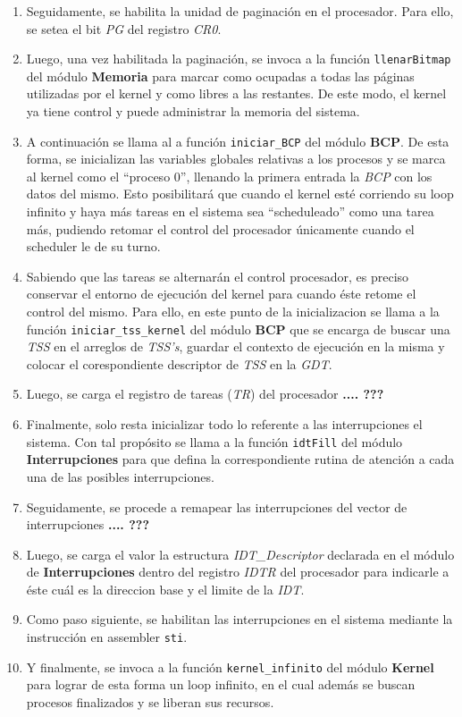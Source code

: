\documentclass[11pt, a4paper]{article}
\begin{document}
\begin{enumerate}
		\item Seguidamente, se habilita la unidad de paginación en el procesador. Para ello, se setea el bit \textit{PG} del registro \textit{CR0}.
		\item Luego, una vez habilitada la paginación, se invoca a la función \texttt{llenarBitmap} del módulo \textbf{Memoria} para marcar como ocupadas a todas las páginas utilizadas por el kernel y como libres a las restantes. De este modo, el kernel ya tiene control y puede administrar la memoria del sistema.
		\item A continuación se llama al a función \texttt{iniciar\_BCP} del módulo \textbf{BCP}. De esta forma, se inicializan las variables globales relativas a los procesos y se marca al kernel como el ``proceso 0'', llenando la primera entrada la \textit{BCP} con los datos del mismo. Esto posibilitará que cuando el kernel esté corriendo su loop infinito y haya más tareas en el sistema sea ``scheduleado'' como una tarea más, pudiendo retomar el control del procesador únicamente cuando el scheduler le de su turno.
		\item Sabiendo que las tareas se alternarán el control procesador, es preciso conservar el entorno de ejecución del kernel para cuando éste retome el control del mismo. Para ello, en este punto de la inicializacion se llama a la función \texttt{iniciar\_tss\_kernel} del módulo \textbf{BCP} que se encarga de buscar una \textit{TSS} en el arreglos de \textit{TSS's}, guardar el contexto de ejecución en la misma y colocar el corespondiente descriptor de \textit{TSS} en la \textit{GDT}.
		\item Luego, se carga el registro de tareas (\textit{TR}) del procesador \textbf{.... ???}
		\item Finalmente, solo resta inicializar todo lo referente a las interrupciones el sistema. Con tal propósito se llama a la función \texttt{idtFill} del módulo \textbf{Interrupciones} para que defina la correspondiente rutina de atención a cada una de las posibles interrupciones.
		\item Seguidamente, se procede a remapear las interrupciones del vector de interrupciones \textbf{.... ???}
		\item Luego, se carga el valor la estructura \textit{IDT\_Descriptor} declarada en el módulo de \textbf{Interrupciones} dentro del registro \textit{IDTR} del procesador para indicarle a éste cuál es la direccion base y el limite de la \textit{IDT}.
		\item Como paso siguiente, se habilitan las interrupciones en el sistema mediante la instrucción en assembler \texttt{sti}. 
		\item Y finalmente, se invoca a la función \texttt{kernel\_infinito} del módulo \textbf{Kernel} para lograr de esta forma un loop infinito, en el cual además se buscan procesos finalizados y se liberan sus recursos.
	\end{enumerate}
\end{document}
